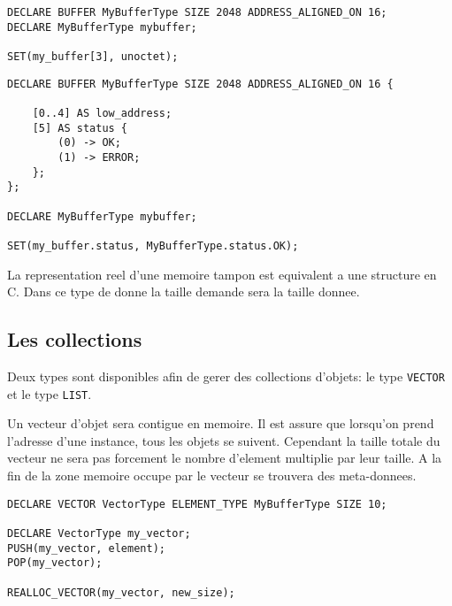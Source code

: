 \documentclass{rtxreport}
\begin{document}
\begin{lstlisting}[caption=Declaration\, instanciation\, utilisation d'une memoire tampon]
DECLARE BUFFER MyBufferType SIZE 2048 ADDRESS_ALIGNED_ON 16;
DECLARE MyBufferType mybuffer;

SET(my_buffer[3], unoctet);
\end{lstlisting}


\begin{lstlisting}[caption=Description du contenu d'une memoire tampon]
DECLARE BUFFER MyBufferType SIZE 2048 ADDRESS_ALIGNED_ON 16 {

	[0..4] AS low_address;
	[5] AS status {
		(0) -> OK;
		(1) -> ERROR;
	};
};

DECLARE MyBufferType mybuffer;

SET(my_buffer.status, MyBufferType.status.OK);
\end{lstlisting}

La representation reel d'une memoire tampon est equivalent a une structure en C.
Dans ce type de donne la taille demande sera la taille donnee.


\subsection{Les collections}

Deux types sont disponibles afin de gerer des collections d'objets:
le type \texttt{VECTOR} et le type \texttt{LIST}.

Un vecteur d'objet sera contigue en memoire. Il est assure que lorsqu'on prend
l'adresse d'une instance, tous les objets se suivent.
Cependant la taille totale du vecteur ne sera pas forcement le nombre d'element multiplie par leur
taille. A la fin de la zone memoire occupe par le vecteur se trouvera des meta-donnees.

\begin{lstlisting}
DECLARE VECTOR VectorType ELEMENT_TYPE MyBufferType SIZE 10;

DECLARE VectorType my_vector;
PUSH(my_vector, element);
POP(my_vector);

REALLOC_VECTOR(my_vector, new_size);
\end{lstlisting}

\end{document}
